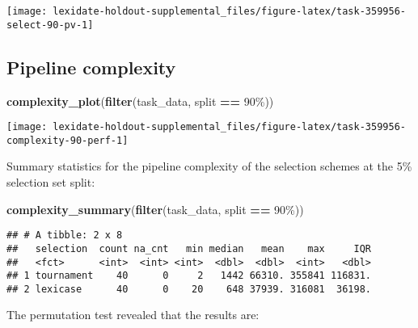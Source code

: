 \documentclass[
]{book}
\newenvironment{Shaded}{\begin{snugshade}}{\end{snugshade}}
\newcommand{\FunctionTok}[1]{\textcolor[rgb]{0.13,0.29,0.53}{\textbf{#1}}}
\newcommand{\NormalTok}[1]{#1}
\newcommand{\SpecialCharTok}[1]{\textcolor[rgb]{0.81,0.36,0.00}{\textbf{#1}}}
\newcommand{\StringTok}[1]{\textcolor[rgb]{0.31,0.60,0.02}{#1}}
\begin{document}
\texttt{[image: lexidate-holdout-supplemental\_files/figure-latex/task-359956-select-90-pv-1]}

\hypertarget{pipeline-complexity-27}{%
\subsection{Pipeline complexity}\label{pipeline-complexity-27}}

\begin{Shaded}
\begin{Highlighting}[]
\FunctionTok{complexity\_plot}\NormalTok{(}\FunctionTok{filter}\NormalTok{(task\_data, split }\SpecialCharTok{==} \StringTok{\textquotesingle{}90\%\textquotesingle{}}\NormalTok{))}
\end{Highlighting}
\end{Shaded}

\texttt{[image: lexidate-holdout-supplemental\_files/figure-latex/task-359956-complexity-90-perf-1]}

Summary statistics for the pipeline complexity of the selection schemes at the 5\% selection set split:

\begin{Shaded}
\begin{Highlighting}[]
\FunctionTok{complexity\_summary}\NormalTok{(}\FunctionTok{filter}\NormalTok{(task\_data, split }\SpecialCharTok{==} \StringTok{\textquotesingle{}90\%\textquotesingle{}}\NormalTok{))}
\end{Highlighting}
\end{Shaded}

\begin{verbatim}
## # A tibble: 2 x 8
##   selection  count na_cnt   min median   mean    max     IQR
##   <fct>      <int>  <int> <int>  <dbl>  <dbl>  <int>   <dbl>
## 1 tournament    40      0     2   1442 66310. 355841 116831.
## 2 lexicase      40      0    20    648 37939. 316081  36198.
\end{verbatim}

The permutation test revealed that the results are:
\end{document}
